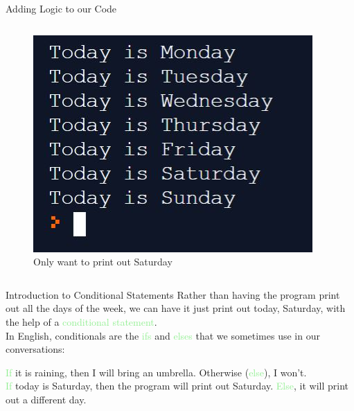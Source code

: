 \documentclass[hyperref={pdfpagemode=FullScreen},aspectratio=169]{beamer}
\begin{document}
\begin{frame}{Adding Logic to our Code}
\begin{columns}[c]
      \begin{column}{0.43\textwidth}
        \begin{figure}
          \includegraphics[scale=0.5]{./imgs/logicProgramOutput.jpg}
          \caption*{Only want to print out Saturday}
        \end{figure}
      \end{column}
    \end{columns}
  \end{frame}

  \begin{frame}{Introduction to Conditional Statements}
    Rather than having the program print out all the days of the week, we can have it just print out today, Saturday, with the help of a \textcolor{lightGreen}{conditional statement}.\\

    In English, conditionals are the \textcolor{lightGreen}{ifs} and \textcolor{lightGreen}{elses} that we sometimes use in our conversations: 

    \begin{center}
      \textcolor{lightGreen}{If} it is raining, then I will bring an umbrella. Otherwise (\textcolor{lightGreen}{else}), I won't.\\

      \smallskip
      \textcolor{lightGreen}{If} today is Saturday, then the program will print out Saturday. \textcolor{lightGreen}{Else}, it will print out a different day.
    \end{center}
  \end{frame}
\end{document}
